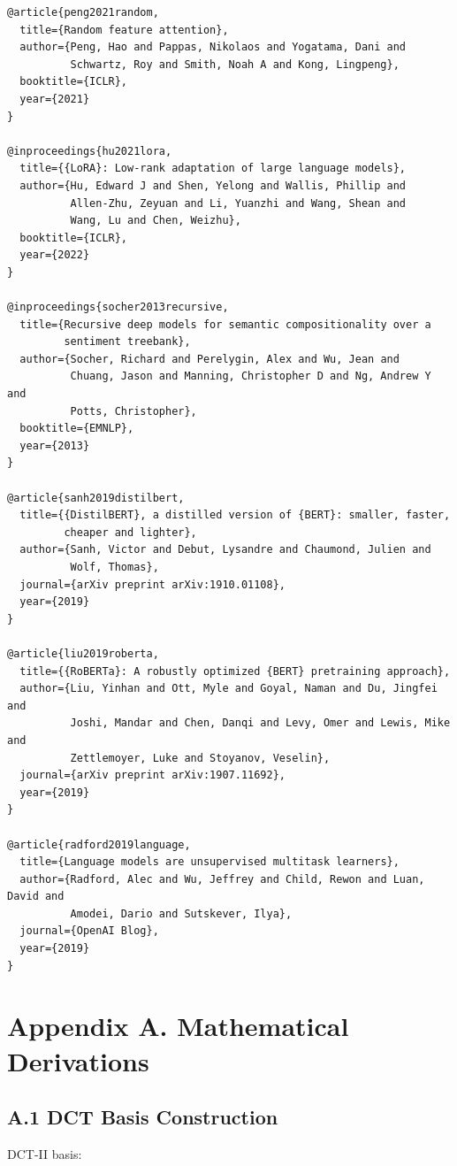 \begin{lstlisting}
@article{peng2021random,
  title={Random feature attention},
  author={Peng, Hao and Pappas, Nikolaos and Yogatama, Dani and 
          Schwartz, Roy and Smith, Noah A and Kong, Lingpeng},
  booktitle={ICLR},
  year={2021}
}

@inproceedings{hu2021lora,
  title={{LoRA}: Low-rank adaptation of large language models},
  author={Hu, Edward J and Shen, Yelong and Wallis, Phillip and 
          Allen-Zhu, Zeyuan and Li, Yuanzhi and Wang, Shean and 
          Wang, Lu and Chen, Weizhu},
  booktitle={ICLR},
  year={2022}
}

@inproceedings{socher2013recursive,
  title={Recursive deep models for semantic compositionality over a 
         sentiment treebank},
  author={Socher, Richard and Perelygin, Alex and Wu, Jean and 
          Chuang, Jason and Manning, Christopher D and Ng, Andrew Y and 
          Potts, Christopher},
  booktitle={EMNLP},
  year={2013}
}

@article{sanh2019distilbert,
  title={{DistilBERT}, a distilled version of {BERT}: smaller, faster, 
         cheaper and lighter},
  author={Sanh, Victor and Debut, Lysandre and Chaumond, Julien and 
          Wolf, Thomas},
  journal={arXiv preprint arXiv:1910.01108},
  year={2019}
}

@article{liu2019roberta,
  title={{RoBERTa}: A robustly optimized {BERT} pretraining approach},
  author={Liu, Yinhan and Ott, Myle and Goyal, Naman and Du, Jingfei and 
          Joshi, Mandar and Chen, Danqi and Levy, Omer and Lewis, Mike and 
          Zettlemoyer, Luke and Stoyanov, Veselin},
  journal={arXiv preprint arXiv:1907.11692},
  year={2019}
}

@article{radford2019language,
  title={Language models are unsupervised multitask learners},
  author={Radford, Alec and Wu, Jeffrey and Child, Rewon and Luan, David and 
          Amodei, Dario and Sutskever, Ilya},
  journal={OpenAI Blog},
  year={2019}
}
\end{lstlisting}




\section{Appendix A. Mathematical Derivations}

\subsection{A.1 DCT Basis Construction}

DCT-II basis:


